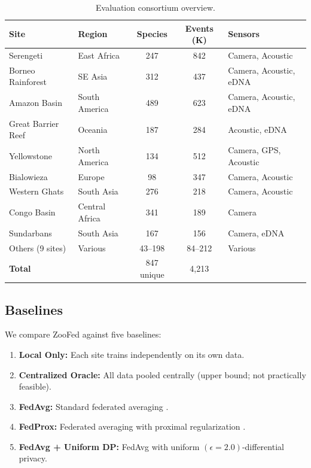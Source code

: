 \documentclass[11pt,a4paper]{article}
\begin{document}
\begin{table}[H]
\centering
\caption{Evaluation consortium overview.}
\label{tab:consortium}
\begin{tabularx}{\textwidth}{@{}llccl@{}}
\toprule
\textbf{Site} & \textbf{Region} & \textbf{Species} & \textbf{Events (K)} & \textbf{Sensors} \\
\midrule
Serengeti & East Africa & 247 & 842 & Camera, Acoustic \\
Borneo Rainforest & SE Asia & 312 & 437 & Camera, Acoustic, eDNA \\
Amazon Basin & South America & 489 & 623 & Camera, Acoustic, eDNA \\
Great Barrier Reef & Oceania & 187 & 284 & Acoustic, eDNA \\
Yellowstone & North America & 134 & 512 & Camera, GPS, Acoustic \\
Bialowieza & Europe & 98 & 347 & Camera, Acoustic \\
Western Ghats & South Asia & 276 & 218 & Camera, Acoustic \\
Congo Basin & Central Africa & 341 & 189 & Camera \\
Sundarbans & South Asia & 167 & 156 & Camera, eDNA \\
Others (9 sites) & Various & 43--198 & 84--212 & Various \\
\midrule
\textbf{Total} & & 847 unique & 4,213 & \\
\bottomrule
\end{tabularx}
\end{table}

\subsection{Baselines}

We compare ZooFed against five baselines:

\begin{enumerate}[leftmargin=*]
    \item \textbf{Local Only:} Each site trains independently on its own data.
    \item \textbf{Centralized Oracle:} All data pooled centrally (upper bound; not practically feasible).
    \item \textbf{FedAvg:} Standard federated averaging \citep{mcmahan2017communication}.
    \item \textbf{FedProx:} Federated averaging with proximal regularization \citep{li2020federated}.
    \item \textbf{FedAvg + Uniform DP:} FedAvg with uniform $(\epsilon=2.0)$-differential privacy.
\end{enumerate}
\end{document}
